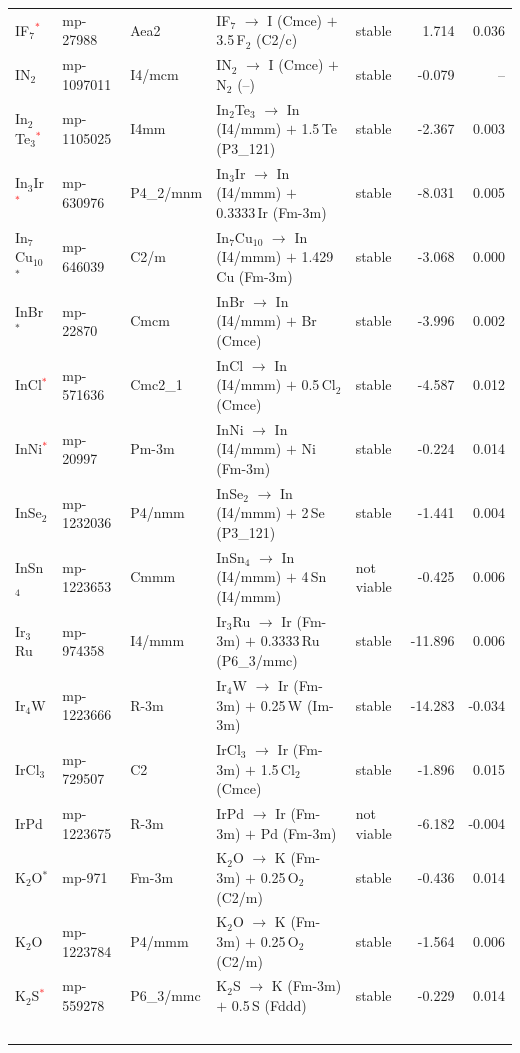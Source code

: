 \begin{longtable}{@{}ll l@{\hspace{4pt}} p{4.6cm} l@{\hspace{4pt}} rr@{}}
IF$_{7}$\textcolor{red}{$^*$} & mp-27988 & Aea2 & IF$_{7}$ $\to$ I (Cmce) $+$ 3.5\,F$_{2}$ (C2/c) & stable & 1.714 & 0.036 \\
IN$_{2}$ & mp-1097011 & I4/mcm & IN$_{2}$ $\to$ I (Cmce) $+$ N$_{2}$ (--) & stable & -0.079 & -- \\
In$_{2}$Te$_{3}$\textcolor{red}{$^*$} & mp-1105025 & I4mm & In$_{2}$Te$_{3}$ $\to$ In (I4/mmm) $+$ 1.5\,Te (P3\_121) & stable & -2.367 & 0.003 \\
In$_{3}$Ir\textcolor{red}{$^*$} & mp-630976 & P4\_2/mnm & In$_{3}$Ir $\to$ In (I4/mmm) $+$ 0.3333\,Ir (Fm-3m) & stable & -8.031 & 0.005 \\
In$_{7}$Cu$_{10}$$^*$ & mp-646039 & C2/m & In$_{7}$Cu$_{10}$ $\to$ In (I4/mmm) $+$ 1.429\,Cu (Fm-3m) & stable & -3.068 & 0.000 \\
InBr$^*$ & mp-22870 & Cmcm & InBr $\to$ In (I4/mmm) $+$ Br (Cmce) & stable & -3.996 & 0.002 \\
InCl\textcolor{red}{$^*$} & mp-571636 & Cmc2\_1 & InCl $\to$ In (I4/mmm) $+$ 0.5\,Cl$_{2}$ (Cmce) & stable & -4.587 & 0.012 \\
InNi\textcolor{red}{$^*$} & mp-20997 & Pm-3m & InNi $\to$ In (I4/mmm) $+$ Ni (Fm-3m) & stable & -0.224 & 0.014 \\
InSe$_{2}$ & mp-1232036 & P4/nmm & InSe$_{2}$ $\to$ In (I4/mmm) $+$ 2\,Se (P3\_121) & stable & -1.441 & 0.004 \\
InSn$_{4}$ & mp-1223653 & Cmmm & InSn$_{4}$ $\to$ In (I4/mmm) $+$ 4\,Sn (I4/mmm) & not viable & -0.425 & 0.006 \\
Ir$_{3}$Ru & mp-974358 & I4/mmm & Ir$_{3}$Ru $\to$ Ir (Fm-3m) $+$ 0.3333\,Ru (P6\_3/mmc) & stable & -11.896 & 0.006 \\
Ir$_{4}$W & mp-1223666 & R-3m & Ir$_{4}$W $\to$ Ir (Fm-3m) $+$ 0.25\,W (Im-3m) & stable & -14.283 & -0.034 \\
IrCl$_{3}$ & mp-729507 & C2 & IrCl$_{3}$ $\to$ Ir (Fm-3m) $+$ 1.5\,Cl$_{2}$ (Cmce) & stable & -1.896 & 0.015 \\
IrPd & mp-1223675 & R-3m & IrPd $\to$ Ir (Fm-3m) $+$ Pd (Fm-3m) & not viable & -6.182 & -0.004 \\
K$_{2}$O$^*$ & mp-971 & Fm-3m & K$_{2}$O $\to$ K (Fm-3m) $+$ 0.25\,O$_{2}$ (C2/m) & stable & -0.436 & 0.014 \\
K$_{2}$O & mp-1223784 & P4/mmm & K$_{2}$O $\to$ K (Fm-3m) $+$ 0.25\,O$_{2}$ (C2/m) & stable & -1.564 & 0.006 \\
K$_{2}$S\textcolor{red}{$^*$} & mp-559278 & P6\_3/mmc & K$_{2}$S $\to$ K (Fm-3m) $+$ 0.5\,S (Fddd) & stable & -0.229 & 0.014 \\
$$
\end{longtable}

